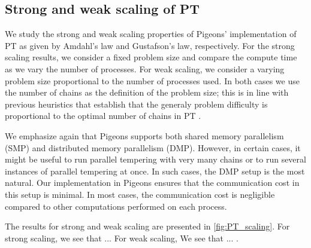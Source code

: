\subsection{Strong and weak scaling of PT}

We study the strong and weak scaling properties of Pigeons' implementation of PT
as given by Amdahl's law and Gustafson's law, respectively.
For the strong scaling results, we consider a fixed problem size and compare the 
compute time as we vary the number of processes.  
For weak scaling, we consider a varying problem size proportional 
to the number of processes used. 
In both cases we use the number of chains as the definition of the problem size; 
this is in line with previous heuristics that establish that the generaly problem 
difficulty is proportional to the optimal number of chains in PT \cite{syed2021nrpt}.

\medskip
We emphasize again that Pigeons supports both shared memory 
parallelism (SMP) and distributed memory parallelism (DMP). However, in certain cases, it 
might be useful to run parallel tempering with very many chains or 
to run several instances of parallel tempering at once. In such cases, 
the DMP setup is the most natural. Our implementation in Pigeons ensures that the 
communication cost in this setup is minimal. In most cases, the 
communication cost is negligible compared to other computations performed on each process. 

\medskip
The results for strong and weak scaling are presented in \cref{fig:PT_scaling}. 
For strong scaling, we see that ...
For weak scaling, We see that ...
.

